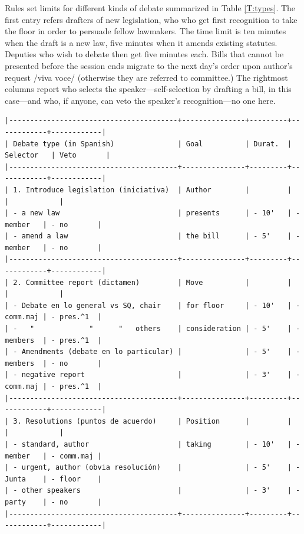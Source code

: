 \documentclass[letter,12pt]{article}
\begin{document}
Rules set limits for different kinds of debate summarized in Table \ref{T:types}. The first entry refers drafters of new legislation, who who get first recognition to take the floor in order to persuade fellow lawmakers. The time limit is ten minutes when the draft is a new law, five minutes when it amends existing statutes. Deputies who wish to debate then get five minutes each. Bills that cannot be presented before the session ends migrate to the next day's order upon author's request /viva voce/ (otherwise they are referred to committee.) The rightmost columns report who selects the speaker---self-selection by drafting a bill, in this case---and who, if anyone, can veto the speaker's recognition---no one here. 

\begin{table}
  \begin{scriptsize}
    \begin{verbatim}
|----------------------------------------+---------------+---------+------------+------------|
| Debate type (in Spanish)               | Goal          | Durat.  | Selector   | Veto       |
|----------------------------------------+---------------+---------+------------+------------|
| 1. Introduce legislation (iniciativa)  | Author        |         |            |            |
| - a new law                            | presents      | - 10'   | - member   | - no       |
| - amend a law                          | the bill      | - 5'    | - member   | - no       |
|----------------------------------------+---------------+---------+------------+------------|
| 2. Committee report (dictamen)         | Move          |         |            |            |
| - Debate en lo general vs SQ, chair    | for floor     | - 10'   | - comm.maj | - pres.^1  |
| -   "             "      "   others    | consideration | - 5'    | - members  | - pres.^1  |
| - Amendments (debate en lo particular) |               | - 5'    | - members  | - no       |
| - negative report                      |               | - 3'    | - comm.maj | - pres.^1  |
|----------------------------------------+---------------+---------+------------+------------|
| 3. Resolutions (puntos de acuerdo)     | Position      |         |            |            |
| - standard, author                     | taking        | - 10'   | - member   | - comm.maj |
| - urgent, author (obvia resolución)    |               | - 5'    | - Junta    | - floor    |
| - other speakers                       |               | - 3'    | - party    | - no       |
|----------------------------------------+---------------+---------+------------+------------|

\end{verbatim}
\end{scriptsize}
\end{table}
\end{document}
